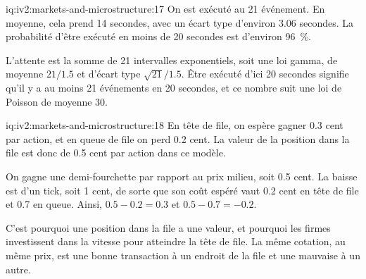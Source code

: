 \begin{solution}{iq:iv2:markets-and-microstructure:17}
On est exécuté au 21 événement. En moyenne, cela prend 14 secondes, avec un écart type d'environ 3.06 secondes. La probabilité d'être exécuté en moins de 20 secondes est d'environ 96~\%.

L'attente est la somme de 21 intervalles exponentiels, soit une loi gamma, de moyenne $21/1.5$ et d'écart type $\sqrt{21}/1.5$. Être exécuté d'ici 20 secondes signifie qu'il y a au moins 21 événements en 20 secondes, et ce nombre suit une loi de Poisson de moyenne 30.

\end{solution}

\begin{solution}{iq:iv2:markets-and-microstructure:18}
En tête de file, on espère gagner 0.3 cent par action, et en queue de file on perd 0.2 cent. La valeur de la position dans la file est donc de 0.5 cent par action dans ce modèle.

On gagne une demi-fourchette par rapport au prix milieu, soit 0.5 cent. La baisse est d'un tick, soit 1 cent, de sorte que son coût espéré vaut 0.2 cent en tête de file et 0.7 en queue. Ainsi, $0.5 - 0.2 = 0.3$ et $0.5 - 0.7 = -0.2$.

C'est pourquoi une position dans la file a une valeur, et pourquoi les firmes investissent dans la vitesse pour atteindre la tête de file. La même cotation, au même prix, est une bonne transaction à un endroit de la file et une mauvaise à un autre.

\end{solution}

